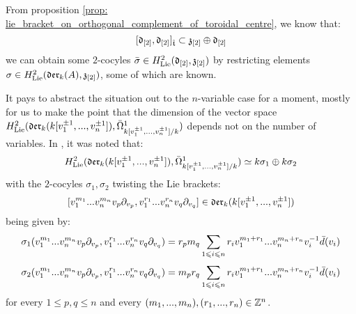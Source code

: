         \begin{remark} \label{remark: non_uniqueness_of_yangian_extended_lie_algebras}
            From proposition \ref{prop: lie_bracket_on_orthogonal_complement_of_toroidal_centre}, we know that:
                $$[\mathfrak{d}_{[2]}, \mathfrak{d}_{[2]}]_{\hat{\mathfrak{t}}} \subset \mathfrak{z}_{[2]} \oplus \mathfrak{d}_{[2]}$$
            we can obtain some $2$-cocyles $\bar{\sigma} \in H^2_{\mathrm{Lie}}(\mathfrak{d}_{[2]}, \mathfrak{z}_{[2]})$ by restricting elements $\sigma \in H^2_{\mathrm{Lie}}(\mathfrak{der}_{k}(A), \mathfrak{z}_{[2]})$, some of which are known.

            It pays to abstract the situation out to the $n$-variable case for a moment, mostly for us to make the point that the dimension of the vector space $H^2_{\mathrm{Lie}}(\mathfrak{der}_{k}(k[v_1^{\pm 1}, ..., v_n^{\pm 1}]), \bar{\Omega}^1_{k[v_1^{\pm 1}, ..., v_n^{\pm 1}]/k})$ depends not on the number of variables. In \cite[p. 5, below Equation 1.3]{billig_energy_momentum_tensor}, it was noted that:
                $$H^2_{\mathrm{Lie}}(\mathfrak{der}_{k}(k[v_1^{\pm 1}, ..., v_n^{\pm 1}]), \bar{\Omega}^1_{k[v_1^{\pm 1}, ..., v_n^{\pm 1}]/k}) \simeq k \sigma_1 \oplus k \sigma_2$$
            with the $2$-cocyles $\sigma_1, \sigma_2$ twisting the Lie brackets:
                $$[v_1^{m_1} ... v_n^{m_n} v_p \partial_{v_p}, v_1^{r_1} ... v_n^{r_n} v_q \partial_{v_q}] \in \mathfrak{der}_{k}(k[v_1^{\pm 1}, ..., v_n^{\pm 1}])$$
            being given by:
                $$\sigma_1(v_1^{m_1} ... v_n^{m_n} v_p \partial_{v_p}, v_1^{r_1} ... v_n^{r_n} v_q \partial_{v_q}) = r_p m_q \sum_{1 \leqslant i \leqslant n} r_i v_1^{m_1 + r_1} ... v_n^{m_n + r_n} v_i^{-1} \bar{d}(v_i)$$
                $$\sigma_2(v_1^{m_1} ... v_n^{m_n} v_p \partial_{v_p}, v_1^{r_1} ... v_n^{r_n} v_q \partial_{v_q}) = m_p r_q \sum_{1 \leqslant i \leqslant n} r_i v_1^{m_1 + r_1} ... v_n^{m_n + r_n} v_i^{-1} \bar{d}(v_i)$$
            for every $1 \leq p, q \leq n$ and every $(m_1, ..., m_n), (r_1, ..., r_n) \in \mathbb{Z}^n$. 


\end{remark}
